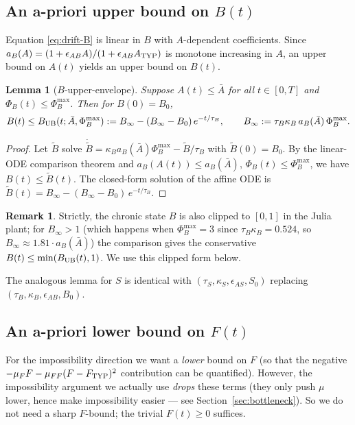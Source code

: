 \documentclass[11pt,a4paper]{article}
\newtheorem{lemma}[theorem]{Lemma}
\theoremstyle{definition}
\newtheorem{remark}[theorem]{Remark}
\begin{document}
\subsection{An a-priori upper bound on $B(t)$}

Equation \eqref{eq:drift-B} is linear in $B$ with $A$-dependent coefficients. Since $a_B(A) = (1 + \epsilon_{AB} A)/(1 + \epsilon_{AB} A_{\rm TYP})$ is monotone increasing in $A$, an upper bound on $A(t)$ yields an upper bound on $B(t)$.

\begin{lemma}[$B$-upper-envelope] \label{lem:B-UB}
Suppose $A(t) \le \bar A$ for all $t \in [0, T]$ and $\Phi_B(t) \le \Phi_B^{\max}$. Then for $B(0) = B_0$,
\[
B(t) \le B_{\rm UB}(t; \bar A, \Phi_B^{\max}) := B_\infty - (B_\infty - B_0)\, e^{-t/\tau_B}, \qquad B_\infty := \tau_B \kappa_B \, a_B(\bar A) \, \Phi_B^{\max}.
\]
\end{lemma}

\begin{proof}
Let $\tilde B$ solve $\dot{\tilde B} = \kappa_B a_B(\bar A) \Phi_B^{\max} - \tilde B/\tau_B$ with $\tilde B(0) = B_0$. By the linear-ODE comparison theorem and $a_B(A(t)) \le a_B(\bar A)$, $\Phi_B(t) \le \Phi_B^{\max}$, we have $B(t) \le \tilde B(t)$. The closed-form solution of the affine ODE is $\tilde B(t) = B_\infty - (B_\infty - B_0)\,e^{-t/\tau_B}$.
\end{proof}

\begin{remark}
Strictly, the chronic state $B$ is also clipped to $[0, 1]$ in the Julia plant; for $B_\infty > 1$ (which happens when $\Phi_B^{\max} = 3$ since $\tau_B \kappa_B = 0.524$, so $B_\infty \approx 1.81 \cdot a_B(\bar A)$) the comparison gives the conservative $B(t) \le \min(B_{\rm UB}(t), 1)$. We use this clipped form below.
\end{remark}

The analogous lemma for $S$ is identical with $(\tau_S, \kappa_S, \epsilon_{AS}, S_0)$ replacing $(\tau_B, \kappa_B, \epsilon_{AB}, B_0)$.

\subsection{An a-priori lower bound on $F(t)$}

For the impossibility direction we want a \emph{lower} bound on $F$ (so that the negative $-\mu_F F - \mu_{FF}(F - F_{\rm TYP})^2$ contribution can be quantified). However, the impossibility argument we actually use \emph{drops} these terms (they only push $\mu$ lower, hence make impossibility easier — see Section~\ref{sec:bottleneck}). So we do not need a sharp $F$-bound; the trivial $F(t) \ge 0$ suffices.
\end{document}
